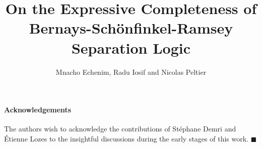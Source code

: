 \documentclass[11pt,a4paper]{llncs}
\begin{document}

\title{On the Expressive Completeness of Bernays-Sch\"onfinkel-Ramsey Separation Logic}

\author{Mnacho Echenim, Radu Iosif and Nicolas Peltier}


\maketitle

\begin{abstract}

\end{abstract}



\vspace*{\baselineskip}
\paragraph{Acknowledgements}
The authors wish to acknowledge the contributions of St\'e\-phane Demri
and \'Etienne Lozes to the insightful discussions during the early
stages of this work. \hfill$\blacksquare$



\end{document}

